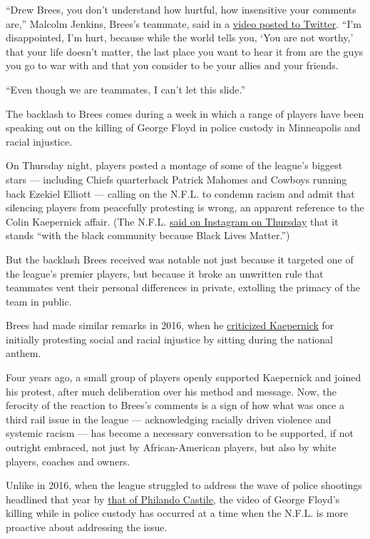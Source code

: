 ``Drew Brees, you don't understand how hurtful, how insensitive your
comments are,'' Malcolm Jenkins, Brees's teammate, said in a
\href{https://twitter.com/MalcolmJenkins/status/1268315207299981312}{video
posted to Twitter}. ``I'm disappointed, I'm hurt, because while the
world tells you, `You are not worthy,' that your life doesn't matter,
the last place you want to hear it from are the guys you go to war with
and that you consider to be your allies and your friends.

``Even though we are teammates, I can't let this slide.''

The backlash to Brees comes during a week in which a range of players
have been speaking out on the killing of George Floyd in police custody
in Minneapolis and racial injustice.

On Thursday night, players posted a montage of some of the league's
biggest stars --- including Chiefs quarterback Patrick Mahomes and
Cowboys running back Ezekiel Elliott --- calling on the N.F.L. to
condemn racism and admit that silencing players from peacefully
protesting is wrong, an apparent reference to the Colin Kaepernick
affair. (The N.F.L.
\href{https://www.instagram.com/p/CBB6ewBA-aO/?igshid=1w2oif5h7qxgi}{said
on Instagram on Thursday} that it stands ``with the black community
because Black Lives Matter.'')

But the backlash Brees received was notable not just because it targeted
one of the league's premier players, but because it broke an unwritten
rule that teammates vent their personal differences in private,
extolling the primacy of the team in public.

Brees had made similar remarks in 2016, when he
\href{https://www.espn.com/blog/new-orleans-saints/post/_/id/23063/drew-brees-wholeheartedly-disagrees-with-colin-kaepernicks-method-of-protest}{criticized
Kaepernick} for initially protesting social and racial injustice by
sitting during the national anthem.

Four years ago, a small group of players openly supported Kaepernick and
joined his protest, after much deliberation over his method and message.
Now, the ferocity of the reaction to Brees's comments is a sign of how
what was once a third rail issue in the league --- acknowledging
racially driven violence and systemic racism --- has become a necessary
conversation to be supported, if not outright embraced, not just by
African-American players, but also by white players, coaches and owners.

Unlike in 2016, when the league struggled to address the wave of police
shootings headlined that year by
\href{https://www.nytimes3xbfgragh.onion/2017/06/20/us/police-shooting-castile-trial-video.html}{that
of Philando Castile}, the video of George Floyd's killing while in
police custody has occurred at a time when the N.F.L. is more proactive
about addressing the issue.

